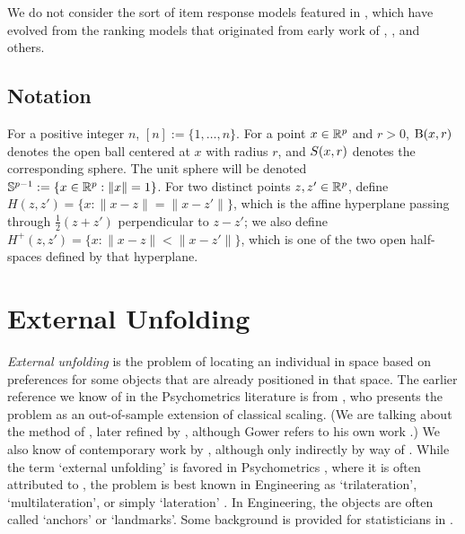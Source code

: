 \documentclass[twoside, 11pt]{article}
\begin{document}
We do not consider the sort of item response models featured in \cite{RECKASE2006607,reckase2009multidimensional}, which have evolved from the ranking models that originated from early work of \citet{thurstone1927law}, \citet{bradley1952rank}, and others. 

\subsection{Notation}
For a positive integer $n$, $[n] := \{1,\dots,n\}$.
For a point $x \in \mathbb{R}^p$ and $r > 0$, $\mathrm{B}(x,r)$ denotes the open ball centered at $x$ with radius $r$, and $S(x,r)$ denotes the corresponding sphere.
The unit sphere will be denoted $\mathbb{S}^{p-1} := \{x \in \mathbb{R}^p : \|x\| = 1\}$.
For two distinct points $z,z' \in \mathbb{R}^p$, define $H(z,z') = \{x : \|x-z\| = \|x-z'\|\}$, which is the affine hyperplane passing through $\frac12(z+z')$ perpendicular to $z-z'$; we also define $H^+(z,z') = \{x : \|x-z\| < \|x-z'\|\}$, which is one of the two open half-spaces defined by that hyperplane. 


\section{External Unfolding} 
\label{sec:external}

{\em External unfolding} is the problem of locating an individual in space based on preferences for some objects that are already positioned in that space. 
The earlier reference we know of in the Psychometrics literature is from \citet{gower1968adding}, who presents the problem as an out-of-sample extension of classical scaling. (We are talking about the method of \citet{young1938discussion}, later refined by \citet{torgerson1952multidimensional}, although Gower refers to his own work \cite{gower1966some}.)
We also know of contemporary work by \citet{carroll1967}, although only indirectly by way of \cite{srinivasan1973linear}.
%
While the term `external unfolding' is favored in Psychometrics \cite[Sec 16.1]{borg2005modern}, where it is often attributed to \citet{carroll1972individual}, the problem is best known in Engineering as `trilateration', `multilateration', or simply `lateration'  \cite{chrzanowski1965theoretical, glossary1994, fang1986trilateration, yang2009indoor, savvides2001dynamic, aspnes2006theory}.  
In Engineering, the objects are often called `anchors' or `landmarks'.
Some background is provided for statisticians in \cite{navidi1998statistical}.
\end{document}

